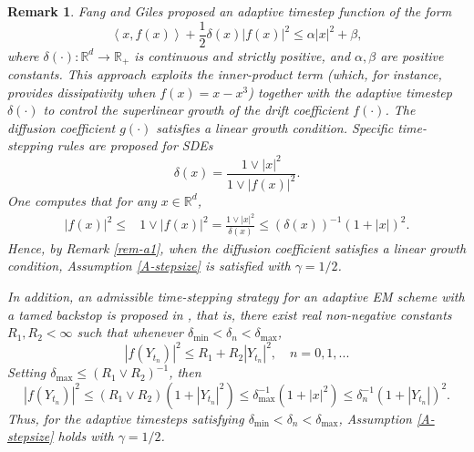 \documentclass[preprint,12pt,compress]{elsarticle}
\newtheorem{remark}[theorem]{Remark}
\begin{document}
\begin{remark}
	Fang and Giles \cite{fang2020adaptive} proposed an adaptive timestep function of the form 
	\begin{equation}  \label{fang-stepsize}
		\left\langle {x,f(x)} \right\rangle  + \frac{1}{2}\delta (x){\left| {f(x)} \right|^2} \le \alpha {\left| x \right|^2} + \beta,
	\end{equation}
	where $\delta (\cdot) : \mathbb{R}^d \to \mathbb{R}_+$ is continuous and strictly positive, and $\alpha, \beta $ are positive constants. This approach exploits the inner-product term (which, for instance, provides dissipativity when $f(x) = x - x^3$) together with the adaptive timestep $\delta(\cdot)$ to control the superlinear growth of the drift coefficient $f(\cdot)$. The diffusion coefficient $g(\cdot)$ satisfies a linear growth condition. Specific time-stepping rules are proposed for SDEs 
	\begin{equation}  \label{re-ab2}
		\delta (x) = \frac{{1 \vee {{\left| x \right|}^2}}}{{1 \vee {{\left| {f(x)} \right|}^2}}} .
	\end{equation}
	One computes that for any $x \in \mathbb{R}^d$,
	\begin{equation*}
		\begin{split}
			{\left| {f(x)} \right|^2} \le& 1 \vee {\left| {f(x)} \right|^2} = \frac{{1 \vee {{\left| x \right|}^2}}}{{\delta (x)}} \le {\left( {\delta (x)} \right)^{ - 1}}{\left( {1 + \left| x \right|} \right)^2}.
		\end{split}
	\end{equation*}
	Hence, by Remark \ref{rem-a1}, when the diffusion coefficient satisfies a linear growth condition, Assumption \ref{A-stepsize} is satisfied with $\gamma = 1/2$.
	
	In addition, an admissible time-stepping strategy for an adaptive EM scheme with a tamed backstop is proposed in \cite[Definition 2.2]{kelly2018adaptive}, that is, there exist real non-negative constants $R_1, R_2 < \infty$ such that whenever $\delta_{\min} < \delta_n < \delta_{\max}$,
	\begin{equation}  \label{re-ab3}
		{\left| {f({Y_{{t_n}}})} \right|^2} \le {R_1} + {R_2}{\left| {{Y_{{t_n}}}} \right|^2}, \quad n = 0,1,...
	\end{equation}	
	Setting ${\delta _{\max }} \le {({R_1} \vee {R_2})^{ - 1}}$, then
	\begin{equation*}
		|f(Y_{t_n})|^2 \le (R_1 \vee R_2)(1+|Y_{t_n}|^2)
		\le \delta_{\max}^{-1}(1+|x|^2)
		\le \delta_n^{-1}(1+|Y_{t_n}|)^2.
	\end{equation*}
Thus, for the adaptive timesteps satisfying $\delta_{\min} < \delta_n < \delta_{\max}$, Assumption \ref{A-stepsize} holds with $\gamma = 1/2$.
	

\end{remark}
\end{document}
